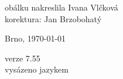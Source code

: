 \vspace*{\fill}
\hspace{10mm}obálku nakreslila Ivana Vlčková\\
korektura: Jan Brzobohatý\\
\begin{otherlanguage}{czech}
Brno, \today\\
\end{otherlanguage}
verze 7.55\\
vysázeno jazykem \LaTeXe
\vspace{2cm}
\newpage
